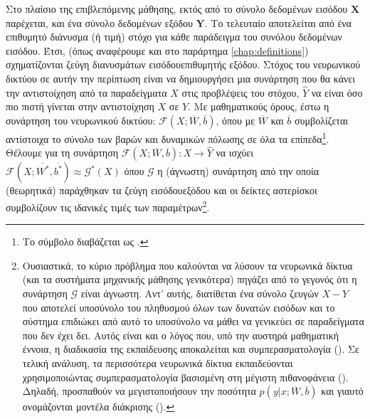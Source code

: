Στο πλαίσιο της επιβλεπόμενης μάθησης, εκτός από το σύνολο δεδομένων εισόδου $\boldsymbol{X}$ παρέχεται, και ένα σύνολο δεδομένων εξόδου $\boldsymbol{Y}$. Το τελευταίο αποτελείται από ένα επιθυμητό διάνυσμα (ή τιμή) στόχο για κάθε παράδειγμα του συνόλου δεδομένων εισόδου. Έτσι, (όπως αναφέρουμε και στο παράρτημα \ref{chap:definitions}) σχηματίζονται ζεύγη διανυσμάτων εισόδου\textendash επιθυμητής εξόδου. Στόχος του νευρωνικού δικτύου σε αυτήν την περίπτωση είναι να δημιουργήσει μια συνάρτηση που θα κάνει την αντιστοίχηση από τα παραδείγματα $X$ στις προβλέψεις του στόχου, $\hat{Y}$ να είναι όσο πιο πιστή γίνεται στην αντιστοίχηση $X$ σε $Y$. Με μαθηματικούς όρους, έστω η συνάρτηση του νευρωνικού δικτύου: $\mathcal{F}(X;\overline{W},\overline{b})$, όπου με $\overline{W}$ και $\overline{b}$ συμβολίζεται αντίστοιχα το σύνολο των βαρών και δυναμικών πόλωσης σε όλα τα επίπεδα\footnote{Το σύμβολο \textquote{\en{;}} διαβάζεται ως .}. Θέλουμε για τη συνάρτηση $\mathcal{F}(X;\overline{W},\overline{b}):X \rightarrow \hat{Y}$ να ισχύει $\mathcal{F}(X;\overline{W^*},\overline{b^*}) \approx \mathcal{G^*}(X)$ όπου $\mathcal{G}$ η (άγνωστη) συνάρτηση από την οποία (θεωρητικά) παράχθηκαν τα ζεύγη εισόδου\textendash εξόδου και οι δείκτες αστερίσκοι συμβολίζουν τις ιδανικές τιμές των παραμέτρων\footnote{Ουσιαστικά, το κύριο πρόβλημα που καλούνται να λύσουν τα νευρωνικά δίκτυα (και τα συστήματα μηχανικής μάθησης γενικότερα) πηγάζει από το γεγονός ότι η συνάρτηση $\mathcal{G}$ είναι άγνωστη. Αντ' αυτής, διατίθεται ένα σύνολο ζευγών $X-Y$ που αποτελεί υποσύνολο του πληθυσμού όλων των δυνατών εισόδων και το σύστημα επιδιώκει από αυτό το υποσύνολο να μάθει να γενικεύει σε παραδείγματα που δεν έχει δει. Αυτός είναι και ο λόγος που, υπό την αυστηρά μαθηματική έννοια, η διαδικασία της εκπαίδευσης αποκαλείται και συμπερασματολογία (). Σε τελική ανάλυση, τα περισσότερα νευρωνικά δίκτυα εκπαιδεύονται χρησιμοποιώντας συμπερασματολογία βασισμένη στη μέγιστη πιθανοφάνεια ()\cite{goodfellow2016deep}. Δηλαδή, προσπαθούν να μεγιστοποιήσουν την ποσότητα $p(y|x;\overline{W},\overline{b})$ και γιαυτό ονομάζονται μοντέλα διάκρισης ().}.\par

